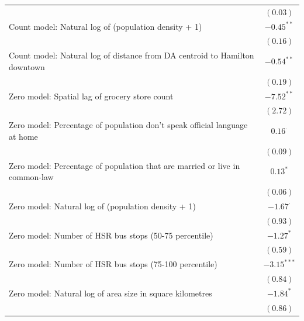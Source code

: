 \documentclass[preprint, 3p,
authoryear]{elsarticle} %
\begin{document}
\begin{table}
\begin{center}
\begin{footnotesize}
\begin{tabular}{l c}
                                                                              & $(0.03)$        \\
Count model: Natural log of (population density + 1)                          & $-0.45^{**}$    \\
                                                                              & $(0.16)$        \\
Count model: Natural log of distance from DA centroid to Hamilton downtown    & $-0.54^{**}$    \\
                                                                              & $(0.19)$        \\
Zero model: Spatial lag of grocery store count                                & $-7.52^{**}$    \\
                                                                              & $(2.72)$        \\
Zero model: Percentage of population don't speak official language at home    & $0.16^{\cdot}$  \\
                                                                              & $(0.09)$        \\
Zero model: Percentage of population that are married or live in common-law   & $0.13^{*}$      \\
                                                                              & $(0.06)$        \\
Zero model: Natural log of (population density + 1)                           & $-1.67^{\cdot}$ \\
                                                                              & $(0.93)$        \\
Zero model: Number of HSR bus stops (50-75 percentile)                        & $-1.27^{*}$     \\
                                                                              & $(0.59)$        \\
Zero model: Number of HSR bus stops (75-100 percentile)                       & $-3.15^{***}$   \\
                                                                              & $(0.84)$        \\
Zero model: Natural log of area size in square kilometres                     & $-1.84^{*}$     \\
                                                                              & $(0.86)$        \\

\end{tabular}
\end{footnotesize}
\end{center}
\end{table}
\end{document}
